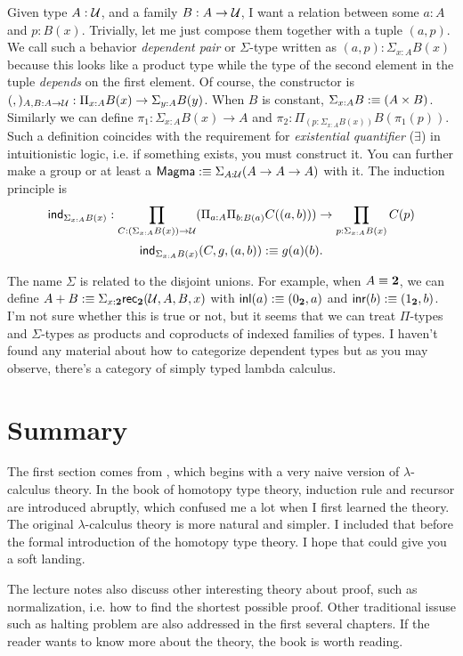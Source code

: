 Given type $A:\mathcal{U}$, and a family $B:A\to\mathcal{U}$, I want a relation
between some $a: A$ and $p: B(x)$. Trivially, let me just compose them
together with a tuple $(a, p)$. We call such a behavior {\it dependent 
pair} or $\Sigma$-type written as $(a,p):\Sigma_{x:A}B(x)$ because this 
looks like a product type while the type of the second element in the
tuple {\it depends} on the first element. Of course, the constructor
is $(,)_{A,B:A\to\mathcal{U}}: \Pi_{x:A}B(x)\to\Sigma_{y:A}B(y)$.
When $B$ is constant, $\Sigma_{x:A}B:\equiv(A\times B)$. Similarly we can
define $\pi_1:\Sigma_{x:A}B(x)\to A$ and 
$\pi_2:\Pi_{(p: \Sigma_{x:A}B(x))}B(\pi_1(p))$. Such a definition coincides
with the requirement for {\it existential quantifier} ($\exists$) in
intuitionistic logic, i.e. if something exists, you must construct it.
You can further make a group or at least a 
$\text{\sf Magma}:\equiv \Sigma_{A:\mathcal{U}}(A\to A\to A)$ with it.
The induction principle is
$$
    \text{\sf ind}_{\Sigma_{x:A}B(x)}:\prod_{C:(\Sigma_{x:A}B(x))\to\mathcal{U}}
    (\Pi_{a:A}\Pi_{b:B(a)}C((a, b)))\to
    \prod_{p: \Sigma_{x:A}B(x)} C(p)
$$
$$
    \text{\sf ind}_{\Sigma_{x:A}B(x)}(C,g,(a,b)) :\equiv g(a)(b).
$$

The name $\Sigma$ is related to the disjoint unions. For example,
when $A\equiv \mathbf{2}$, we can define 
$A+B:\equiv \Sigma_{x:\mathbf{2}}\text{\sf rec}_{\mathbf{2}}(\mathcal{U},A,B,x)$ with 
$\text{\sf inl}(a):\equiv(0_{\mathbf{2}},a)$ and $\text{\sf inr}(b):\equiv(1_{\mathbf{2}},b)$. I'm not sure
whether this is true or not, but it seems that we can treat $\Pi$-types
and $\Sigma$-types as products and coproducts of indexed families of 
types. I haven't found any material about how to categorize dependent
types but as you may observe, there's a category of simply typed lambda
calculus. 

\section{Summary}
The first section comes from \cite{Curry-Howard}, which begins with a very
naive version of $\lambda$-calculus theory. 
In the book \cite{homotopy-type-theory} of homotopy type theory, induction
rule and recursor are introduced abruptly, which confused me a lot when
I first learned the theory. The original $\lambda$-calculus theory is
more natural and simpler. I included that before the formal introduction
of the homotopy type theory. I hope that could give you a soft landing.

The lecture notes \cite{Curry-Howard} also discuss other interesting
theory about proof, such as normalization, i.e. how to find the shortest
possible proof. Other traditional issuse such as halting problem are also
addressed in the first several chapters. If the reader wants to know more
about the theory, the book is worth reading. 


